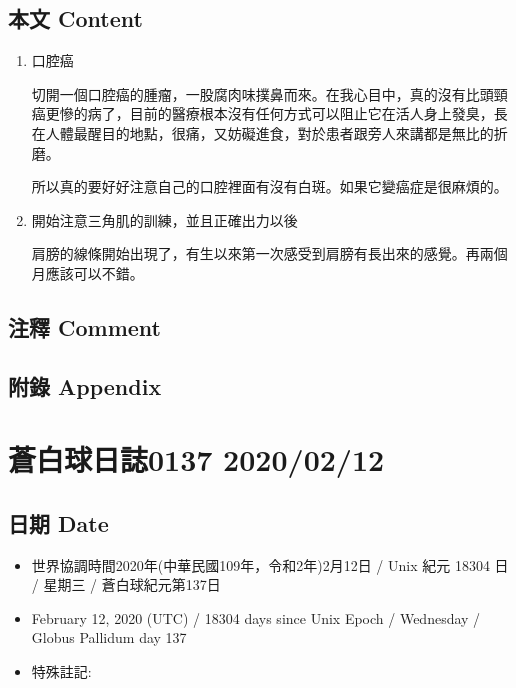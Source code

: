 \documentclass[
]{article}
\providecommand{\tightlist}{%
  \setlength{\itemsep}{0pt}\setlength{\parskip}{0pt}}
\begin{document}
\hypertarget{ux672cux6587-content-10}{%
\subsection{本文 Content}\label{ux672cux6587-content-10}}

\begin{enumerate}
\def\labelenumi{\arabic{enumi}.}
\item
  口腔癌

  切開一個口腔癌的腫瘤，一股腐肉味撲鼻而來。在我心目中，真的沒有比頭頸癌更慘的病了，目前的醫療根本沒有任何方式可以阻止它在活人身上發臭，長在人體最醒目的地點，很痛，又妨礙進食，對於患者跟旁人來講都是無比的折磨。

  所以真的要好好注意自己的口腔裡面有沒有白斑。如果它變癌症是很麻煩的。
\item
  開始注意三角肌的訓練，並且正確出力以後

  肩膀的線條開始出現了，有生以來第一次感受到肩膀有長出來的感覺。再兩個月應該可以不錯。
\end{enumerate}

\hypertarget{ux6ce8ux91cb-comment-10}{%
\subsection{注釋 Comment}\label{ux6ce8ux91cb-comment-10}}

\hypertarget{ux9644ux9304-appendix-10}{%
\subsection{附錄 Appendix}\label{ux9644ux9304-appendix-10}}

\hypertarget{ux84bcux767dux7403ux65e5ux8a8c0137-20200212}{%
\section{蒼白球日誌0137
2020/02/12}\label{ux84bcux767dux7403ux65e5ux8a8c0137-20200212}}

\hypertarget{ux65e5ux671f-date-11}{%
\subsection{日期 Date}\label{ux65e5ux671f-date-11}}

\begin{itemize}
\tightlist
\item
  世界協調時間2020年(中華民國109年，令和2年)2月12日 / Unix 紀元 18304 日
  / 星期三 / 蒼白球紀元第137日
\item
  February 12, 2020 (UTC) / 18304 days since Unix Epoch / Wednesday /
  Globus Pallidum day 137
\item
  特殊註記:
\end{itemize}
\end{document}
